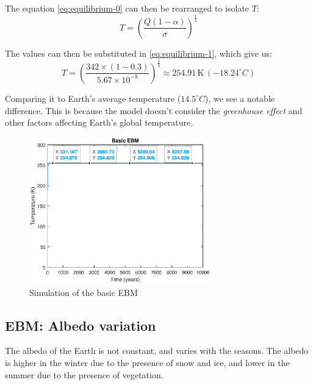 \documentclass[12pt]{article}
\begin{document}
\noindent The equation \ref{eq:equilibrium-0} can then be rearranged to isolate $T$:
\begin{equation} \label{eq:equilibrium-1}
    T = \left( \frac{Q(1 - \alpha)}{\sigma} \right)^{\frac{1}{4}}
\end{equation}

\noindent The values can then be substituted in \ref{eq:equilibrium-1}, which give us:
\begin{equation}
    T = \left( \frac{342 \times (1 - 0.3)}{5.67 \times 10^{-8}} \right)^{\frac{1}{4}} \approx 254.91 \, \text{K} \, ({-18.24}^\circ C)
\end{equation}

Comparing it to Earth's average temperature (${14.5}^\circ C$), we see a notable difference. This is because the model doesn't consider the \textit{greenhouse effect} and other factors affecting Earth's global temperature.

\begin{figure}[H]
    \centering
    \includegraphics[width=0.7\textwidth]{images/ebm_basic.eps}
    \caption{Simulation of the basic EBM}
    \label{fig:basic_ebm}
\end{figure}

\subsection{EBM: Albedo variation}

The albedo of the Earth is not constant, and varies with the seasons. The albedo is higher in the winter due to the presence of snow and ice, and lower in the summer due to the presence of vegetation\cite{kaper-2013-math-ac-albedo}.
\end{document}
